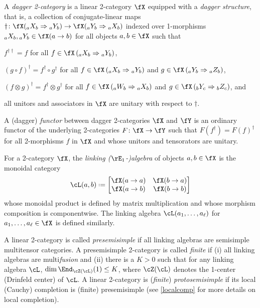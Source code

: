 \documentclass[12pt,reqno]{amsart}
\newcommand{\defn}[1]{\emph{#1}}
\DeclareRobustCommand{\coloneq}{\mathrel{\vcenter{\baselineskip0.5ex\lineskiplimit0pt\hbox{\scriptsize{\upshape.}}\hbox{\scriptsize{\upshape.}}}}=}
\begin{document}
\begin{definition}
  \label{dagger 2-category}
  A \defn{dagger 2-category} is a linear 2-category $\fX$ equipped with a \defn{dagger structure}, that is, a collection of conjugate-linear maps $\dag\colon\fX({}_aX_b\Rightarrow{}_aY_b) \to \fX({}_aY_b\Rightarrow{}_aX_b)$ indexed over 1-morphisms ${}_aX_b, {}_aY_b \in \fX(a \to b)$ for all objects $a, b\in \fX$ such that
  \begin{lst}
    \item[(2$\dag$a)]\label{2daga} $f^{\dag\dag}=f$ for all $f\in \fX\left({ }_aX_b \Rightarrow{ }_aY_b\right)$,
    \item[(2$\dag$b)]\label{2dagb} $(g \circ f)^{\dag}=f^{\dag} \circ g^{\dag}$ for all $f \in \fX\left({ }_aX_b \Rightarrow{ }_aY_b\right)$ and $g \in \fX\left({ }_aY_b \Rightarrow{ }_aZ_b\right)$,
    \item[(2$\dag$c)]\label{2dagc} $\left(f \otimes g\right)^{\dag}=f^{\dag} \otimes g^{\dag}$ for all $f \in \fX\left({ }_aW_b \Rightarrow{ }_aX_b\right)$ and $g \in \fX\left({ }_bY_c \Rightarrow{ }_bZ_c\right)$, and
    \item[(2$\dag$d)]\label{2dagd} all unitors and associators in $\fX$ are unitary with respect to $\dag$.
  \end{lst}
  A (dagger) \defn{functor} between dagger 2-categories $\fX$ and $\fY$ is an ordinary functor of the underlying 2-categories $F\colon \fX\to\fY$ such that $F(f^\dag)=F(f)^\dag$ for all 2-morphisms $f$ in $\fX$ and whose unitors and tensorators are unitary.
\end{definition}

\begin{definition}
  \label{2.25}
  For a 2-category $\fX$, the \defn{linking ($\rE_1$-)algebra} of objects $a,b\in\fX$ is the monoidal category
  \[
    \cL(a, b)\coloneq
    \begin{bmatrix}\fX(a\to a)&\fX(b\to a) \\ \fX(a\to b) & \fX(b\to b)\end{bmatrix}
  \]
  whose monoidal product is defined by matrix multiplication and whose morphism composition is componentwise. The linking algebra $\cL(a_1,\dots,a_{\ell})$ for $a_1,\dots,a_\ell\in\fX$ is defined similarly.
\end{definition}

\begin{definition}\label{def:presemisimple}
  A linear 2-category is called \defn{presemisimple} if all linking algebras are semisimple multitensor categories. A presemisimple 2-category is called \defn{finite} if (i) all linking algebras are multi\emph{fusion} and (ii) there is a $K>0$ such that for any linking algebra $\cL$, $\dim\End_{\cZ(\cL)}(1)\leq K$, where $\cZ(\cL)$ denotes the 1-center (Drinfeld center) of $\cL$.
  A linear 2-category is (\defn{finite}) \defn{protosemisimple} if its local (Cauchy) completion is (finite) presemisimple (see \cref{localcomp} for more details on local completion). 
\end{definition}
\end{document}
